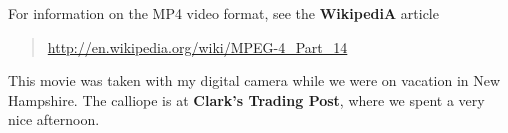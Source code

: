 \documentclass{article}
\begin{document}
\maketitle

\begin{center}
\end{center}
For information on the MP4 video format, see the \textbf{WikipediA} article
\begin{quote}
    \url{http://en.wikipedia.org/wiki/MPEG-4_Part_14}
\end{quote}
This movie was taken with my digital camera while we were on vacation in New Hampshire.
The calliope is at \textbf{Clark's Trading Post}, where we spent a very
nice afternoon.
\end{document}
